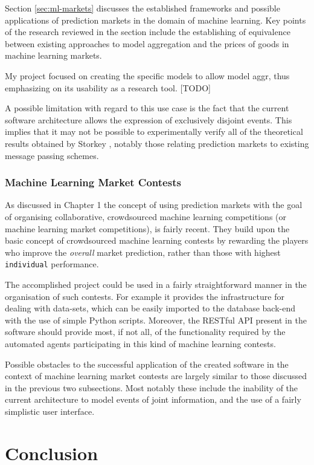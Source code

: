 \documentclass[bsc,frontabs,twoside,singlespacing,parskip,deptreport]{infthesis}     %
\begin{document}
	Section \ref{sec:ml-markets} discusses the established frameworks and possible applications of prediction markets in the domain of machine learning. Key points of the research reviewed in the section include the establishing of equivalence between existing approaches to model aggregation and the prices of goods in machine learning markets. 

	My project focused on creating the specific models to allow model aggr, thus emphasizing on its usability as a research tool. [TODO]

	A possible limitation with regard to this use case is the fact that the current software architecture allows the expression of exclusively disjoint events. This implies that it may not be possible to experimentally verify all of the theoretical results obtained by Storkey \cite{storkey_machine_2011}, notably those relating prediction markets to existing message passing schemes. 

\subsection{Machine Learning Market Contests}

	As discussed in Chapter 1 the concept of using prediction markets with the goal of organising collaborative, crowdsourced machine learning competitions (or machine learning market competitions), is fairly recent. They build upon the basic concept of crowdsourced machine learning contests by rewarding the players who improve the {\it overall} market prediction, rather than those with highest {\tt individual} performance. 

	The accomplished project could be used in a fairly straightforward manner in the organisation of such contests. For example it provides the infrastructure for dealing with data-sets, which can be easily imported to the database back-end with the use of simple Python scripts. Moreover, the RESTful API present in the software should provide most, if not all, of the functionality required by the automated agents participating in this kind of machine learning contests. 

	Possible obstacles to the successful application of the created software in the context of machine learning market contests are largely similar to those discussed in the previous two subsections. Most notably these include the inability of the current architecture to model events of joint information, and the use of a fairly simplistic user interface. 

\chapter{Conclusion}






\end{document}
